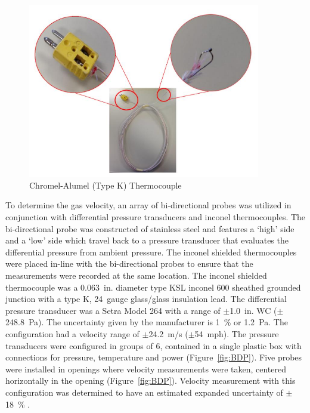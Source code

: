 \documentclass[12pt,oneside]{book}
\begin{document}
\begin{figure} [H]
	\centering
	\includegraphics[width = 4in]{0_Images/Instrumentation/Thermocouple.jpg}
	\caption{Chromel-Alumel (Type K) Thermocouple}
	\label{fig:Thermocouple}
\end{figure}

To determine the gas velocity, an array of bi-directional probes was utilized in conjunction with differential pressure transducers and inconel thermocouples. The bi-directional probe was constructed of stainless steel and features a `high' side and a `low' side which travel back to a pressure transducer that evaluates the differential pressure from ambient pressure. The inconel shielded thermocouples were placed in-line with the bi-directional probes to ensure that the measurements were recorded at the same location. The inconel shielded thermocouple was a 0.063~in. diameter type KSL inconel 600 sheathed grounded junction with a type K, 24~gauge glass/glass insulation lead. The differential pressure transducer was a Setra Model 264 with a range of $\pm$1.0~in. WC ($\pm$248.8~Pa). The uncertainty given by the manufacturer is 1~\% or 1.2~Pa. The configuration had a velocity range of $\pm$24.2~m/s ($\pm$54~mph). The pressure transducers were configured in groups of 6, contained in a single plastic box with connections for pressure, temperature and power (Figure~\ref{fig:BDP}). Five probes were installed in openings where velocity measurements were taken, centered horizontally in the opening (Figure~\ref{fig:BDP}). Velocity measurement with this configuration was determined to have an estimated expanded uncertainty of $\pm$18~\% \cite{BDPInPoolFires}.
\end{document}

